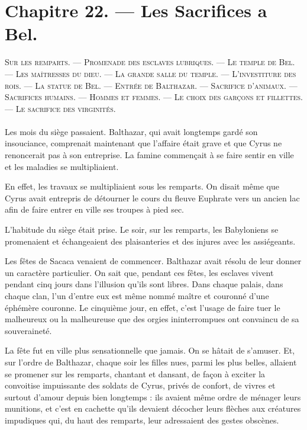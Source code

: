 \documentclass[a4paper, 11pt, oneside, polutonikogreek, french]{article}
\begin{document}
\section{Chapitre 22. --- Les Sacrifices a Bel.}
\begin{center}
\scshape
\small
Sur les remparts. --- Promenade des esclaves lubriques. --- Le temple de Bel. --- Les maîtresses du dieu. --- La grande salle du temple. --- L'investiture des rois. --- La statue de Bel. --- Entrée de Balthazar. --- Sacrifice d'animaux. --- Sacrifices humains. --- Hommes et femmes. --- Le choix des garçons et fillettes. --- Le sacrifice des virginités.
\end{center}
\paragraph{}
Les mois du siège passaient. Balthazar, qui avait longtemps gardé son insouciance, comprenait maintenant que l'affaire était grave et que Cyrus ne renoncerait pas à son entreprise. La famine commençait à se faire sentir en ville et les maladies se multipliaient.

En effet, les travaux se multipliaient sous les remparts. On disait même que Cyrus avait entrepris de détourner le cours du fleuve Euphrate vers un ancien lac afin de faire entrer en ville ses troupes à pied sec.

L'habitude du siège était prise. Le soir, sur les remparts, les Babyloniens se promenaient et échangeaient des plaisanteries et des injures avec les assiégeants.

Les fêtes de Sacaca venaient de commencer. Balthazar avait résolu de leur donner un caractère particulier. On sait que, pendant ces fêtes, les esclaves vivent pendant cinq jours dans l'illusion qu'ils sont libres. Dans chaque palais, dans chaque clan, l'un d'entre eux est même nommé maître et couronné d'une éphémère couronne. Le cinquième jour, en effet, c'est l'usage de faire tuer le malheureux ou la malheureuse que des orgies ininterrompues ont convaincu de sa souveraineté.

La fête fut en ville plus sensationnelle que jamais. On se hâtait de s'amuser. Et, sur l'ordre de Balthazar, chaque soir les filles nues, parmi les plus belles, allaient se promener sur les remparts, chantant et dansant, de façon à exciter la convoitise impuissante des soldats de Cyrus, privés de confort, de vivres et surtout d'amour depuis bien longtemps : ils avaient même ordre de ménager leurs munitions, et c'est en cachette qu'ils devaient décocher leurs flèches aux créatures impudiques qui, du haut des remparts, leur adressaient des gestes obscènes.
\end{document}

